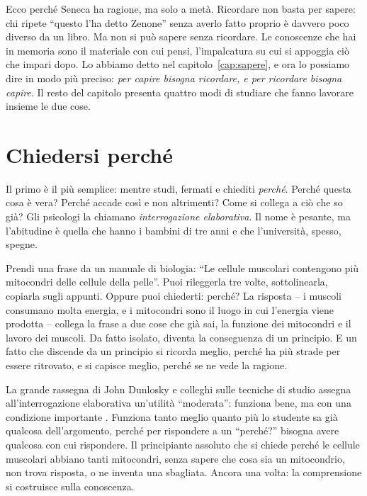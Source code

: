 Ecco perché Seneca ha ragione, ma solo a metà. Ricordare non basta per
sapere: chi ripete \enquote{questo l'ha detto Zenone} senza averlo fatto
proprio è davvero poco diverso da un libro. Ma non si può sapere senza
ricordare. Le conoscenze che hai in memoria sono il materiale con cui
pensi, l'impalcatura su cui si appoggia ciò che impari dopo. Lo
abbiamo detto nel capitolo~\ref{cap:sapere}, e ora lo possiamo dire in
modo più preciso: \emph{per capire bisogna ricordare, e per ricordare
bisogna capire}. Il resto del capitolo presenta quattro modi di
studiare che fanno lavorare insieme le due cose.

\section{Chiedersi perché}

Il primo è il più semplice: mentre studi, fermati e chiediti
\emph{perché}. Perché questa cosa è vera? Perché accade così e non
altrimenti? Come si collega a ciò che so già? Gli psicologi la chiamano
\emph{interrogazione elaborativa}. Il nome è pesante, ma l'abitudine è
quella che hanno i bambini di tre anni e che l'università, spesso,
spegne.

Prendi una frase da un manuale di biologia: \enquote{Le cellule
muscolari contengono più mitocondri delle cellule della pelle}. Puoi
rileggerla tre volte, sottolinearla, copiarla sugli appunti. Oppure
puoi chiederti: perché? La risposta -- i muscoli consumano molta
energia, e i mitocondri sono il luogo in cui l'energia viene prodotta --
collega la frase a due cose che già sai, la funzione dei mitocondri e
il lavoro dei muscoli. Da fatto isolato, diventa la conseguenza di un
principio. E un fatto che discende da un principio si ricorda meglio,
perché ha più strade per essere ritrovato, e si capisce meglio, perché
se ne vede la ragione.

La grande rassegna di John Dunlosky e colleghi sulle tecniche di
studio assegna all'interrogazione elaborativa un'utilità
\enquote{moderata}: funziona bene, ma con una condizione importante
\parencite{dunlosky2013}. Funziona tanto meglio quanto più lo studente
sa già qualcosa dell'argomento, perché per rispondere a un
\enquote{perché?} bisogna avere qualcosa con cui rispondere. Il
principiante assoluto che si chiede perché le cellule muscolari abbiano
tanti mitocondri, senza sapere che cosa sia un mitocondrio, non trova
risposta, o ne inventa una sbagliata. Ancora una volta: la comprensione
si costruisce sulla conoscenza.

